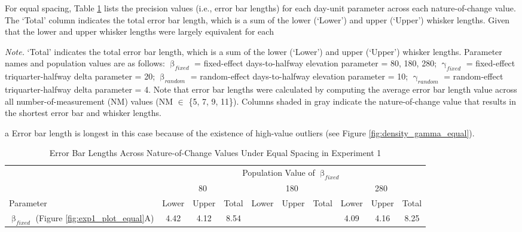 \documentclass[
12pt, %
twoside,
english]{guelphthesis}
\begin{document}
For equal spacing, Table \ref{tab:errorbar-equal-nc} lists the precision values (i.e., error bar lengths) for each day-unit parameter across each nature-of-change value. The `Total' column indicates the total error bar length, which is a sum of the lower (`Lower') and upper (`Upper') whisker lengths. Given that the lower and upper whisker lengths were largely equivalent for each
\begin{ThreePartTable}
\begin{TableNotes}
\item \textit{Note. }`Total' indicates the total error bar length, which is a sum of the lower (`Lower') and upper (`Upper') whisker lengths. Parameter names and population values are as follows: $\upbeta_{fixed}$ = fixed-effect days-to-halfway elevation parameter = {80, 180, 280}; $\upgamma_{fixed}$ = fixed-effect triquarter-halfway delta parameter = 20; $\upbeta_{random}$ = random-effect days-to-halfway elevation parameter = 10; $\upgamma_{random}$ = random-effect triquarter-halfway delta parameter = 4. Note that error bar lengths were calculated by computing the average error bar length value across all number-of-measurement (NM) values (NM $\in$ \{5, 7, 9, 11\}). Columns shaded in gray indicate the nature-of-change value that results in the shortest error bar and whisker lengths.
\item[a] Error bar length is longest in this case because of the existence of high-value outliers (see Figure \ref{fig:density_gamma_equal}).
\end{TableNotes}
\begin{longtable}[l]{>{\raggedright\arraybackslash}p{3cm}ccc>{}c>{}c>{}cccc}
\caption{\label{tab:errorbar-equal-nc}Error Bar Lengths Across Nature-of-Change Values Under Equal Spacing in Experiment 1}\\
\toprule
\multicolumn{1}{c}{ } & \multicolumn{9}{c}{Population Value of $\upbeta_{fixed}$} \\
\cmidrule(l{3pt}r{3pt}){2-10}
\multicolumn{1}{c}{ } & \multicolumn{3}{c}{80} & \multicolumn{3}{c}{180} & \multicolumn{3}{c}{280} \\
\cmidrule(l{3pt}r{3pt}){2-4} \cmidrule(l{3pt}r{3pt}){5-7} \cmidrule(l{3pt}r{3pt}){8-10}
Parameter & Lower & Upper & Total & Lower & Upper & Total & Lower & Upper & Total\\
\midrule
\thead[lt]{$\upbeta_{fixed}$ \\ (Figure \ref{fig:exp1_plot_equal}A)} & 4.42 & 4.12 & 8.54 & \cellcolor[HTML]{DFDEDE}{2.46} & \cellcolor[HTML]{DFDEDE}{2.32} & \cellcolor[HTML]{DFDEDE}{4.78} & 4.09 & 4.16 & 8.25\\

\end{longtable}
\end{ThreePartTable}
\end{document}
